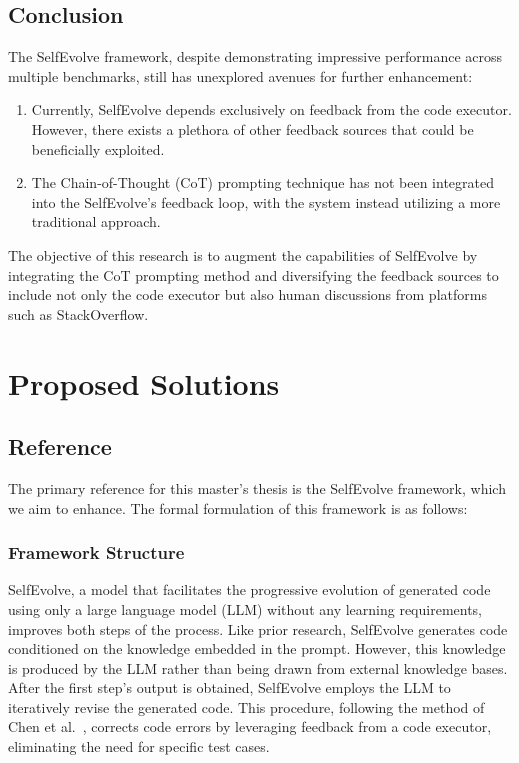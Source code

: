 \documentclass[a4paper,oneside]{book}
\begin{document}
\section{Conclusion}
The SelfEvolve framework, despite demonstrating impressive performance across multiple benchmarks, still has unexplored avenues for further enhancement:

\begin{enumerate}
    \item Currently, SelfEvolve depends exclusively on feedback from the code executor. However, there exists a plethora of other feedback sources that could be beneficially exploited.

    \item The Chain-of-Thought (CoT) prompting technique has not been integrated into the SelfEvolve's feedback loop, with the system instead utilizing a more traditional approach.
\end{enumerate}

The objective of this research is to augment the capabilities of SelfEvolve by integrating the CoT prompting method and diversifying the feedback sources to include not only the code executor but also human discussions from platforms such as StackOverflow.

\chapter{Proposed Solutions}
\section{Reference}
The primary reference for this master's thesis is the SelfEvolve framework, which we aim to enhance. The formal formulation of this framework is as follows:

\subsection{Framework Structure}
SelfEvolve, a model that facilitates the progressive evolution of generated code using only a large language model (LLM) without any learning requirements, improves both steps of the process. Like prior research, SelfEvolve generates code conditioned on the knowledge embedded in the prompt. However, this knowledge is produced by the LLM rather than being drawn from external knowledge bases. After the first step's output is obtained, SelfEvolve employs the LLM to iteratively revise the generated code. This procedure, following the method of Chen et al.~\cite{chen2023teaching}, corrects code errors by leveraging feedback from a code executor, eliminating the need for specific test cases.
\end{document}
